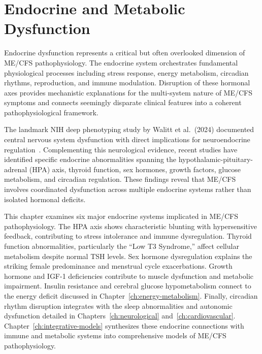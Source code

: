 \chapter{Endocrine and Metabolic Dysfunction}
\label{ch:endocrine}

Endocrine dysfunction represents a critical but often overlooked dimension of ME/CFS pathophysiology. The endocrine system orchestrates fundamental physiological processes including stress response, energy metabolism, circadian rhythms, reproduction, and immune modulation. Disruption of these hormonal axes provides mechanistic explanations for the multi-system nature of ME/CFS symptoms and connects seemingly disparate clinical features into a coherent pathophysiological framework.

The landmark NIH deep phenotyping study by Walitt et al.\ (2024) documented central nervous system dysfunction with direct implications for neuroendocrine regulation~\cite{walitt2024deep}. Complementing this neurological evidence, recent studies have identified specific endocrine abnormalities spanning the hypothalamic-pituitary-adrenal (HPA) axis, thyroid function, sex hormones, growth factors, glucose metabolism, and circadian regulation. These findings reveal that ME/CFS involves coordinated dysfunction across multiple endocrine systems rather than isolated hormonal deficits.

This chapter examines six major endocrine systems implicated in ME/CFS pathophysiology. The HPA axis shows characteristic blunting with hypersensitive feedback, contributing to stress intolerance and immune dysregulation. Thyroid function abnormalities, particularly the ``Low T3 Syndrome,'' affect cellular metabolism despite normal TSH levels. Sex hormone dysregulation explains the striking female predominance and menstrual cycle exacerbations. Growth hormone and IGF-1 deficiencies contribute to muscle dysfunction and metabolic impairment. Insulin resistance and cerebral glucose hypometabolism connect to the energy deficit discussed in Chapter~\ref{ch:energy-metabolism}. Finally, circadian rhythm disruption integrates with the sleep abnormalities and autonomic dysfunction detailed in Chapters~\ref{ch:neurological} and~\ref{ch:cardiovascular}. Chapter~\ref{ch:integrative-models} synthesizes these endocrine connections with immune and metabolic systems into comprehensive models of ME/CFS pathophysiology.

